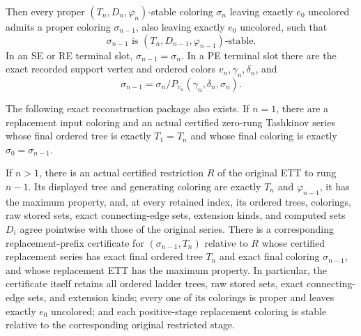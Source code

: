 \begin{helper}
Then every proper \((T_n,D_n,\varphi_n)\)-stable coloring \(\sigma_n\)
leaving exactly \(e_0\) uncolored admits a proper coloring
\(\sigma_{n-1}\), also leaving exactly \(e_0\) uncolored, such that
\[
 \sigma_{n-1}\text{ is }(T_n,D_{n-1},\varphi_{n-1})\text{-stable}.
 \tag{A}
\]
In an SE or RE terminal slot, \(\sigma_{n-1}=\sigma_n\).  In a PE
terminal slot there are the exact recorded support vertex and ordered
colors \(v_n,\gamma_n,\delta_n\), and
\[
 \sigma_{n-1}=\sigma_n/P_{v_n}(\gamma_n,\delta_n,\sigma_n).
\]

The following exact reconstruction package also exists.
If \(n=1\), there are a replacement input coloring and an actual
certified zero-rung Tashkinov series whose final ordered tree is exactly
\(T_1=T_n\) and whose final coloring is exactly \(\sigma_0=\sigma_{n-1}\).

If \(n>1\), there is an actual certified restriction \(R\) of the
original ETT to rung \(n-1\).  Its displayed tree and generating coloring
are exactly \(T_n\) and \(\varphi_{n-1}\), it has the maximum property,
and, at every retained index, its ordered trees, colorings, raw stored
sets, exact connecting-edge sets, extension kinds, and computed sets
\(D_i\) agree pointwise with those of the original series.  There is a
corresponding replacement-prefix certificate for
\((\sigma_{n-1},T_n)\) relative to \(R\) whose certified replacement
series has exact final ordered tree \(T_n\) and exact final coloring
\(\sigma_{n-1}\), and whose replacement ETT has the maximum property.
In particular, the certificate itself retains all ordered ladder trees,
raw stored sets, exact connecting-edge sets, and extension kinds; every
one of its colorings is proper and leaves exactly \(e_0\) uncolored; and
each positive-stage replacement coloring is stable relative to the
corresponding original restricted stage.
\end{helper}
